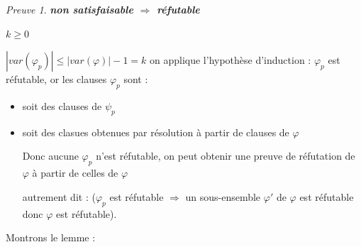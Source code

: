 \documentclass[]{article}
\theoremstyle{remark}
\newtheorem{myproof}{Preuve}
\theoremstyle{definition}
\newenvironment{proofpart}[1]{
	\leavevmode
	
	\noindent
	{\textit{\textbf{\boldmath #1}}}
	
}{
	\checkmark
}
\begin{document}
\begin{myproof}
\begin{proofpart}{non satisfaisable $\Longrightarrow$ réfutable}
\begin{proofpart}{$k \geqslant 0$}
			$|var(\varphi_p)| \leqslant |var(\varphi)| - 1 = k$ on applique l'hypothèse d'induction : $\varphi_p$ est réfutable, or les clauses $\varphi_p$ sont :
			\begin{itemize}
				\item soit des clauses de $\psi_p$
				\item soit des clasues obtenues par résolution à partir de clauses de $\varphi$
				
				Donc aucune $\varphi_p$ n'est réfutable, on peut obtenir une preuve de réfutation de $\varphi$ à partir de celles de $\varphi$
				
				autrement dit : ($\varphi_p$ est réfutable $\Longrightarrow$ un sous-ensemble $\varphi'$  de $\varphi$ est réfutable donc $\varphi$ est réfutable).
			\end{itemize}
		\end{proofpart}
		
	\end{proofpart}
\end{myproof}

Montrons le lemme :
\end{document}
